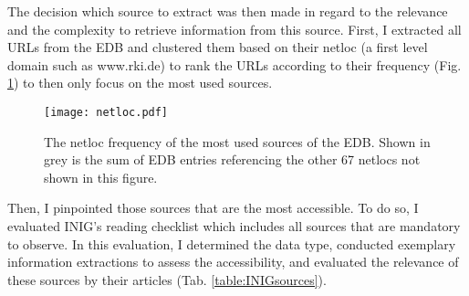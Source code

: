   The decision which source to extract was then made in regard to the relevance and the complexity to retrieve information from this source.
  First, I extracted all URLs from the EDB and clustered them based on their netloc (a first level domain such as www.rki.de) to rank the URLs according to their frequency (Fig. \ref{fig:netloc}) to then only focus on the most used sources.
  \begin{figure}[h!]
    \centering
    \texttt{[image: netloc.pdf]}
    \caption{The netloc frequency of the most used sources of the EDB. Shown in grey is the sum of EDB entries referencing the other 67 netlocs not shown in this figure.}
  \label{fig:netloc}
  \end{figure}
  Then, I pinpointed those sources that are the most accessible.
  To do so, I evaluated INIG's reading checklist which includes all sources that are mandatory to observe.
  In this evaluation, I determined the data type, conducted exemplary information extractions to assess the accessibility, and evaluated the relevance of these sources by their articles (Tab. \ref{table:INIGsources}).
